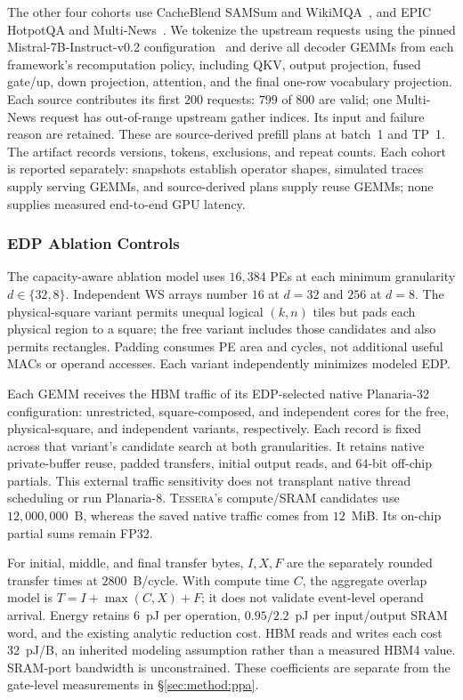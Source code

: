 The other four cohorts use CacheBlend SAMSum and WikiMQA~\cite{cacheblendcode},
and EPIC HotpotQA and Multi-News~\cite{epiccode,longbenchdata}.
We tokenize the upstream requests using the pinned
Mistral-7B-Instruct-v0.2 configuration~\cite{mistralv02config} and derive
all decoder GEMMs from each framework's recomputation policy, including
QKV, output projection, fused gate/up, down projection, attention, and
the final one-row vocabulary projection. Each source contributes its
first $200$ requests: $799$ of $800$ are valid; one Multi-News request
has out-of-range upstream gather indices. Its input and failure reason
are retained. These are source-derived prefill plans at batch~1 and TP~1.
The artifact records versions, tokens, exclusions, and repeat counts.
Each cohort is reported separately: snapshots establish operator
shapes, simulated traces supply serving GEMMs, and source-derived plans
supply reuse GEMMs; none supplies measured end-to-end GPU latency.

\subsubsection{EDP Ablation Controls}
The capacity-aware ablation model uses $16{,}384$ PEs at each minimum granularity
$d\in\{32,8\}$. Independent WS arrays number $16$ at $d=32$ and $256$
at $d=8$. The physical-square variant permits unequal logical
$(k,n)$ tiles but pads each physical region to a square; the free
variant includes those candidates and also permits rectangles.
Padding consumes PE area and cycles, not additional useful MACs or
operand accesses. Each variant independently minimizes modeled EDP.

Each GEMM receives the HBM traffic of its EDP-selected native
Planaria-32 configuration: unrestricted, square-composed, and independent
cores for the free, physical-square, and independent variants,
respectively. Each record is fixed across that variant's candidate
search at both granularities. It retains native private-buffer reuse,
padded transfers, initial output reads, and 64-bit off-chip partials.
This external traffic sensitivity does not transplant native thread
scheduling or run Planaria-8. \textsc{Tessera}'s compute/SRAM candidates use
$12{,}000{,}000$~B, whereas the saved native traffic comes from
$12$~MiB. Its on-chip partial sums remain FP32.

For initial, middle, and final transfer bytes, $I,X,F$ are the
separately rounded transfer times at $2800$~B/cycle. With compute time
$C$, the aggregate overlap model is $T=I+\max(C,X)+F$; it does not
validate event-level operand arrival. Energy retains $6$~pJ per operation,
$0.95/2.2$~pJ per input/output SRAM word, and the existing analytic
reduction cost. HBM reads and writes each cost $32$~pJ/B, an inherited
modeling assumption rather than a measured HBM4 value.
SRAM-port bandwidth is unconstrained. These coefficients are separate
from the gate-level measurements in
\S\ref{sec:method:ppa}.

